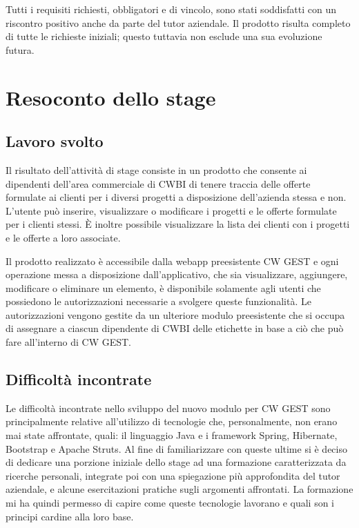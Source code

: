 \noindent Tutti i requisiti richiesti, obbligatori e di vincolo, sono stati soddisfatti con un riscontro positivo anche da parte del tutor aziendale. Il prodotto risulta completo di tutte le richieste iniziali; questo tuttavia non esclude una sua evoluzione futura.

\pagebreak

\section{Resoconto dello stage}

\subsection{Lavoro svolto}
Il risultato dell'attività di stage consiste in un prodotto che consente ai dipendenti dell'area commerciale di CWBI di tenere traccia delle offerte formulate ai clienti per i diversi progetti a disposizione dell'azienda stessa e non. L'utente può inserire, visualizzare o modificare i progetti e le offerte formulate per i clienti stessi. È inoltre possibile visualizzare la lista dei clienti con i progetti e le offerte a loro associate. 

\setlength{\parskip}{3ex}

\noindent Il prodotto realizzato è accessibile dalla webapp preesistente CW GEST e ogni operazione messa a disposizione dall'applicativo, che sia visualizzare, aggiungere, modificare o eliminare un elemento, è disponibile solamente agli utenti che possiedono le autorizzazioni necessarie a svolgere queste funzionalità. Le autorizzazioni vengono gestite da un ulteriore modulo preesistente che si occupa di assegnare a ciascun dipendente di CWBI delle etichette in base a ciò che può fare all'interno di CW GEST.

\subsection{Difficoltà incontrate}
Le difficoltà incontrate nello sviluppo del nuovo modulo per CW GEST sono principalmente relative all'utilizzo di tecnologie che, personalmente, non erano mai state affrontate, quali: il linguaggio Java e i framework Spring, Hibernate, Bootstrap e Apache Struts. Al fine di familiarizzare con queste ultime si è deciso di dedicare una porzione iniziale dello stage ad una formazione caratterizzata da ricerche personali, integrate poi con una spiegazione più approfondita del tutor aziendale, e alcune esercitazioni pratiche sugli argomenti affrontati. La formazione mi ha quindi permesso di capire come queste tecnologie lavorano e quali son i principi cardine alla loro base.  

